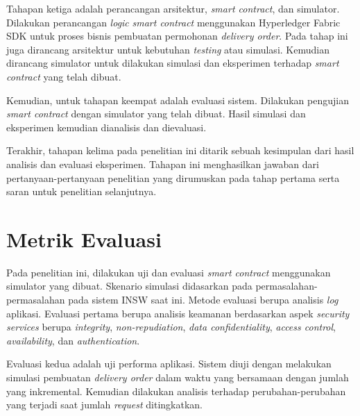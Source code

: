 Tahapan ketiga adalah perancangan arsitektur, \textit{smart contract}, dan simulator. Dilakukan perancangan \textit{logic} \textit{smart contract} menggunakan Hyperledger Fabric SDK untuk proses bisnis pembuatan permohonan \textit{delivery order}. Pada tahap ini juga dirancang arsitektur untuk kebutuhan \textit{testing} atau simulasi. Kemudian dirancang simulator untuk dilakukan simulasi dan eksperimen terhadap \textit{smart contract} yang telah dibuat.

Kemudian, untuk tahapan keempat adalah evaluasi sistem. Dilakukan pengujian \textit{smart contract} dengan simulator yang telah dibuat. Hasil simulasi dan eksperimen kemudian dianalisis dan dievaluasi.

Terakhir, tahapan kelima pada penelitian ini ditarik sebuah kesimpulan dari hasil analisis dan evaluasi eksperimen. Tahapan ini menghasilkan jawaban dari pertanyaan-pertanyaan penelitian yang dirumuskan pada tahap pertama serta saran untuk penelitian selanjutnya.


\section{Metrik Evaluasi}
\label{sec:metrikevaluasi}

Pada penelitian ini, dilakukan uji dan evaluasi \textit{smart contract} menggunakan simulator yang dibuat. Skenario simulasi didasarkan pada permasalahan-permasalahan pada sistem INSW saat ini. Metode evaluasi berupa analisis \textit{log} aplikasi. Evaluasi pertama berupa analisis keamanan berdasarkan aspek \textit{security services} berupa \textit{integrity}, \textit{non-repudiation}, \textit{data confidentiality}, \textit{access control}, \textit{availability}, dan \textit{authentication}.

Evaluasi kedua adalah uji performa aplikasi. Sistem diuji dengan melakukan simulasi pembuatan \textit{delivery order} dalam waktu yang bersamaan dengan jumlah yang inkremental. Kemudian dilakukan analisis terhadap perubahan-perubahan yang terjadi saat jumlah \textit{request} ditingkatkan.
